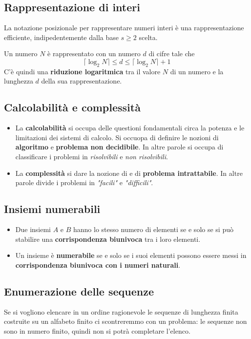 \subsection{Rappresentazione di interi}
La notazione posizionale per rappresentare numeri interi \`e una rappresentazione
efficiente, indipedentemente dalla base $s \geq 2$ scelta.

Un numero $N$ \`e rappresentato con un numero $d$ di cifre tale che
\[ \lceil \log_2 N \rceil \leq d \leq \lceil \log_2 N \rceil + 1 \]
C'\`e quindi una \textbf{riduzione logaritmica} tra il valore $N$ di un numero e la
lunghezza $d$ della sua rappresentazione.

\subsection{Calcolabilit\`a e complessit\`a}
\begin{itemize}
	\item La \textbf{calcolabilit\`a} si occupa delle questioni fondamentali circa la
	      potenza e le limitazioni dei sistemi di calcolo. Si occuopa di definire le
	      nozioni di \textbf{algoritmo} e \textbf{problema non decidibile}. In altre
	      parole si occupa di classificare i problemi in \emph{risolvibili} e
	      \emph{non risolvibili}.
	\item La \textbf{complessit\`a} si dare la nozione di 
	      e di \textbf{problema intrattabile}. In altre parole divide i problemi in
	      \emph{"facili"} e \emph{"difficili"}.
\end{itemize}

\subsection{Insiemi numerabili}
\begin{itemize}
	\item Due insiemi $A$ e $B$ hanno lo stesso numero di elementi se e solo se si pu\`o
	      stabilire una \textbf{corrispondenza biunivoca} tra i loro elementi.
	\item Un insieme \`e \textbf{numerabile} se e solo se i suoi elementi possono essere
	      messi in \textbf{corrispondenza biunivoca con i numeri naturali}.
\end{itemize}

\subsection{Enumerazione delle sequenze}
Se si vogliono elencare in un ordine ragionevole le sequenze di lunghezza finita
costruite su un alfabeto finito ci scontreremmo con un problema: le sequenze non sono
in numero finito, quindi non si potr\`a completare l'elenco.

